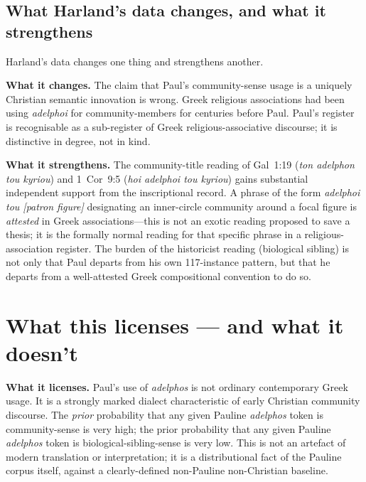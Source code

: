 \documentclass[11pt,oneside]{article}
\begin{document}
\subsection*{What Harland's data changes, and what it strengthens}

Harland's data changes one thing and strengthens another.

\textbf{What it changes.}  The claim that Paul's community-sense
usage is a uniquely Christian semantic innovation is wrong.  Greek
religious associations had been using \textit{adelphoi} for
community-members for centuries before Paul.  Paul's register is
recognisable as a sub-register of Greek religious-associative
discourse; it is distinctive in degree, not in kind.

\textbf{What it strengthens.}  The community-title reading of
Gal~1:19 (\textit{ton adelphon tou kyriou}) and 1~Cor~9:5
(\textit{hoi adelphoi tou kyriou}) gains substantial independent
support from the inscriptional record.  A phrase of the form
\textit{adelphoi tou [patron figure]} designating an inner-circle
community around a focal figure is \textit{attested} in Greek
associations---this is not an exotic reading proposed to save a
thesis; it is the formally normal reading for that specific phrase in
a religious-association register.  The burden of the historicist
reading (biological sibling) is not only that Paul departs from his
own 117-instance pattern, but that he departs from a well-attested
Greek compositional convention to do so.

\section*{What this licenses — and what it doesn't}

\textbf{What it licenses.}  Paul's use of \textit{adelphos} is not
ordinary contemporary Greek usage.  It is a strongly marked dialect
characteristic of early Christian community discourse.  The
\textit{prior} probability that any given Pauline \textit{adelphos}
token is community-sense is very high; the prior probability that any
given Pauline \textit{adelphos} token is biological-sibling-sense is
very low.  This is not an artefact of modern translation or
interpretation; it is a distributional fact of the Pauline corpus
itself, against a clearly-defined non-Pauline non-Christian baseline.
\end{document}
